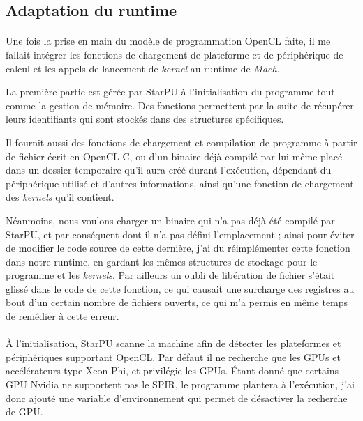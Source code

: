 \subsection{Adaptation du runtime}
\paragraph{}
Une fois la prise en main du modèle de programmation OpenCL faite, il me fallait
intégrer les fonctions de chargement de plateforme et de périphérique de calcul
et les appels de lancement de \emph{kernel} au runtime de \emph{Mach}.

La première partie est gérée par StarPU à l'initialisation du programme tout
comme la gestion de mémoire. Des fonctions permettent par la suite de récupérer
leurs identifiants qui sont stockés dans des structures spécifiques.

Il fournit aussi des fonctions de chargement et compilation de programme à
partir de fichier écrit en OpenCL C, ou d'un binaire déjà compilé par lui-même
placé dans un dossier temporaire qu'il aura créé durant l'exécution, dépendant
du périphérique utilisé et d'autres informations, ainsi qu'une fonction de
chargement des \emph{kernels} qu'il contient.

Néanmoins, nous voulons charger un binaire qui n'a pas déjà été compilé par
StarPU, et par conséquent dont il n'a pas défini l'emplacement ; ainsi pour
éviter de modifier le code source de cette dernière, j'ai du réimplémenter cette
fonction dans notre runtime, en gardant les mêmes structures de stockage pour le
programme et les \emph{kernels}. Par ailleurs un oubli de libération de fichier
s'était glissé dans le code de cette fonction, ce qui causait une surcharge des
registres au bout d'un certain nombre de fichiers ouverts, ce qui m'a permis en
même temps de remédier à cette erreur.

\paragraph{}
À l'initialisation, StarPU scanne la machine afin de détecter les plateformes
et périphériques supportant OpenCL. Par défaut il ne recherche que les GPUs et
accélérateurs type Xeon Phi, et privilégie les GPUs. Étant donné que certains
GPU Nvidia ne supportent pas le SPIR, le programme plantera à l'exécution, j'ai
donc ajouté une variable d'environnement qui permet de désactiver la recherche
de GPU.

